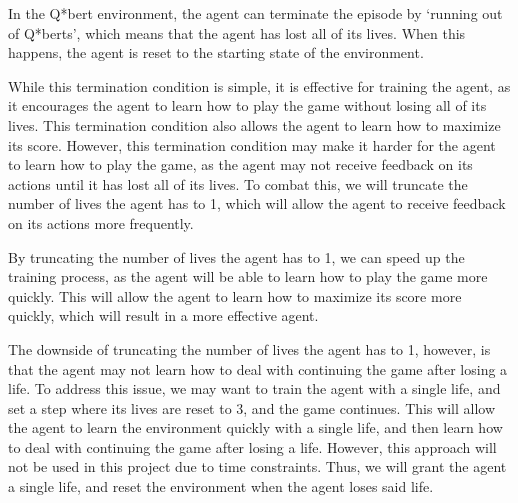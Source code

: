 In the Q*bert environment, the agent can terminate the episode by `running out
of Q*berts', which means that the agent has lost all of its lives. When this
happens, the agent is reset to the starting state of the environment.

While this termination condition is simple, it is effective for training the
agent, as it encourages the agent to learn how to play the game without losing
all of its lives. This termination condition also allows the agent to learn how
to maximize its score. However, this termination condition may make it harder
for the agent to learn how to play the game, as the agent may not receive
feedback on its actions until it has lost all of its lives. To combat this, we
will truncate the number of lives the agent has to 1, which will allow the
agent to receive feedback on its actions more frequently.

By truncating the number of lives the agent has to 1, we can speed up the
training process, as the agent will be able to learn how to play the game more
quickly. This will allow the agent to learn how to maximize its score more
quickly, which will result in a more effective agent.

The downside of truncating the number of lives the agent has to 1, however, is
that the agent may not learn how to deal with continuing the game after losing
a life. To address this issue, we may want to train the agent with a single
life, and set a step where its lives are reset to 3, and the game continues.
This will allow the agent to learn the environment quickly with a single life,
and then learn how to deal with continuing the game after losing a life.
However, this approach will not be used in this project due to time
constraints. Thus, we will grant the agent a single life, and reset the
environment when the agent loses said life.